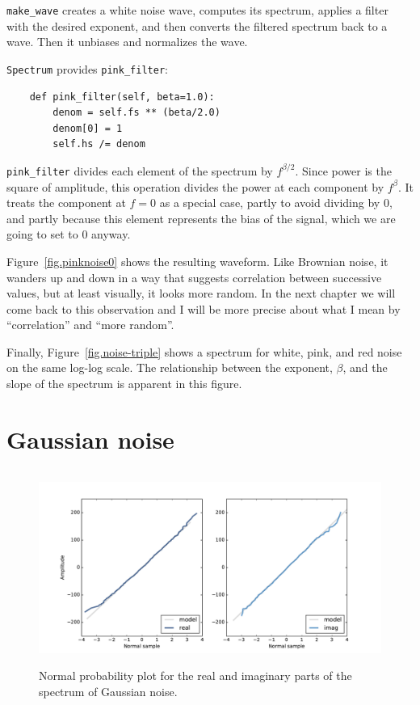 \documentclass[12pt]{book}
\begin{document}
\verb"make_wave" creates a white noise wave, computes its spectrum,
applies a filter with the desired exponent, and then converts the
filtered spectrum back to a wave.  Then it unbiases and normalizes
the wave.

{\tt Spectrum} provides \verb"pink_filter":

\begin{verbatim}
    def pink_filter(self, beta=1.0):
        denom = self.fs ** (beta/2.0)
        denom[0] = 1
        self.hs /= denom
\end{verbatim}

\verb"pink_filter" divides each element of the spectrum by
$f^{\beta/2}$.  Since power is the square of amplitude, this
operation divides the power at
each component by $f^\beta$.  It treats the component
at $f=0$ as a special case, partly to avoid dividing by 0, and partly
because this element represents the bias of the signal,
which we are going to set to 0 anyway. 

Figure~\ref{fig.pinknoise0} shows the resulting waveform.  Like
Brownian noise, it wanders up and down in a way that suggests
correlation between successive values, but at least visually, it looks
more random.  In the next chapter we will come back to this
observation and I will be more precise about what I mean by
``correlation'' and ``more random''.

Finally, Figure~\ref{fig.noise-triple} shows a spectrum for
white, pink, and red noise on the same log-log scale.
The relationship between the exponent, $\beta$, and the slope
of the spectrum is apparent in this figure.


\section{Gaussian noise}

\begin{figure}
\centerline{\includegraphics[height=2.5in]{figs/noise1.pdf}}
\caption{Normal probability plot for the real and imaginary parts
of the spectrum of Gaussian noise.}
\label{fig.noise1}
\end{figure}
\end{document}
